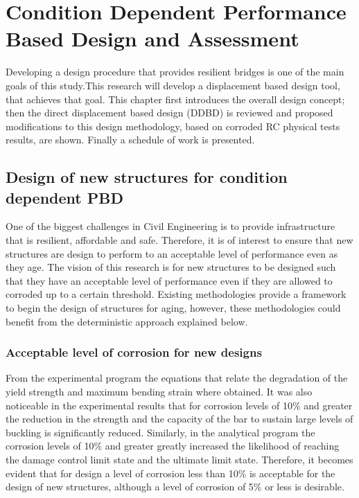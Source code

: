\chapter{Condition Dependent Performance Based Design and Assessment}

\label{chap-six}

Developing a design procedure that provides resilient bridges is one of the main goals of this study.This research will develop a displacement based design tool, that achieves that goal. This chapter first introduces the overall design concept; then the direct displacement based design (DDBD) is reviewed and proposed modifications to this design methodology, based on corroded RC physical tests results, are shown. Finally a schedule of work is presented.

\section{Design of new structures for condition dependent PBD}

One of the biggest challenges in Civil Engineering is to provide infrastructure that is resilient, affordable and safe. Therefore, it is of interest to ensure that new structures are design to perform to an acceptable level of performance even as they age. The vision of this research is for new structures to be designed such that they have an acceptable level of performance even if they are allowed to corroded up to a certain threshold. Existing methodologies provide a framework to begin the design of structures for aging, however, these methodologies could benefit from the deterministic approach explained below.

\subsection{Acceptable level of corrosion for new designs}
From the experimental program the equations that relate the degradation of the yield strength and maximum bending strain where obtained. It was also noticeable in the experimental results that for corrosion levels of 10\% and greater the reduction in the strength and the capacity of the bar to sustain large levels of buckling is significantly reduced. Similarly, in the analytical program the corrosion levels of 10\% and greater greatly increased the likelihood of reaching the damage control limit state and the ultimate limit state. Therefore, it becomes evident that for design a level of corrosion less than 10\% is acceptable for the design of new structures, although a level of corrosion of 5\% or less is desirable.

